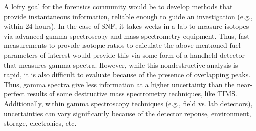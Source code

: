 A lofty goal for the forensics community would be to develop methods that
provide instantaneous information, reliable enough to guide an investigation
(e.g., within 24 hours). In the case of \gls{SNF}, it takes weeks in a lab to
measure isotopes via advanced gamma spectroscopy and mass spectrometry
equipment. Thus, fast measurements to provide isotopic ratios to calculate the
above-mentioned fuel parameters of interest would provide this via some form of
a handheld detector that measures gamma spectra.  However, while this
nondestructive analysis is rapid, it is also difficult to evaluate because of
the presence of overlapping peaks. Thus, gamma spectra give less information at
a higher uncertainty than the near-perfect results of some destructive mass
spectrometry techniques, like TIMS.
Additionally, within gamma spectroscopy techniques (e.g., field vs. lab
detectors), uncertainties can vary significantly because of the detector
reponse, environment, storage, electronics, etc. 

